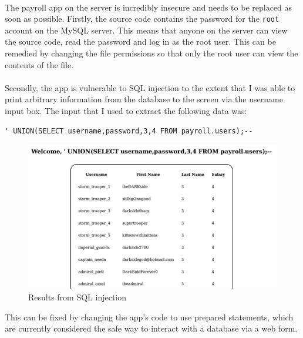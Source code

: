 \documentclass{article}
\begin{document}
\paragraph{}
The payroll app on the server is incredibly insecure and needs to be replaced as soon as possible.
Firstly, the source code contains the password for the \texttt{root} account on the MySQL server.
This means that anyone on the server can view the source code, read the password and log in as the root user.
This can be remedied by changing the file permissions so that only the root user can view the contents of the file.

\paragraph{}
Secondly, the app is vulnerable to SQL injection to the extent that I was able to print arbitrary information from the database to the screen via the username input box.
The input that I used to extract the following data was:
\begin{verbatim}
' UNION(SELECT username,password,3,4 FROM payroll.users);--
\end{verbatim}
\begin{figure}[H]
	\includegraphics[width=\linewidth, frame]{resources/sql_injection.png}
	\caption{Results from SQL injection}
	\label{fig:sql_injection}
\end{figure}
This can be fixed by changing the app's code to use prepared statements, which are currently considered the safe way to interact with a database via a web form.
\end{document}

